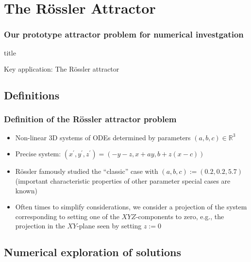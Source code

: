 \documentclass[usenames,svgnames,dvipsnames,10pt]{beamer}
\newcommand{\TitleBoxed}[1]{
     \begin{beamercolorbox}[sep=8pt,center,shadow=true,rounded=true]{title}
          \usebeamerfont{title}#1\vskip 0.6cm\par%
     \end{beamercolorbox}
}
\begin{document}
\section{The R\"ossler Attractor} 


\begin{frame}
\frametitle{Our prototype attractor problem for numerical investgation} 

\TitleBoxed{
     \huge{\centerline{Key application: The R\"ossler attractor}}
}

\end{frame}

\subsection{Definitions} 

\begin{frame}
\frametitle{Definition of the R\"ossler attractor problem}

\begin{itemize} 

\item Non-linear 3D systems of ODEs determined by parameters $(a, b, c) \in \mathbb{R}^3$ 
\item Precise system: $(x^{\prime}, y^{\prime}, z^{\prime}) = (-y-z, x+ay, b + z(x-c))$ 
\item R\"ossler famously studied the ``classic'' case with $(a, b, c) := (0.2, 0.2, 5.7)$ 
      (important characteristic properties of other parameter special cases are known) 
\item Often times to simplify considerations, we consider a projection of the system corresponding to 
      setting one of the $XYZ$-components to zero, e.g., the projection in the $XY$-plane seen by setting 
      $z := 0$ 

\end{itemize} 

\end{frame}

\subsection{Numerical exploration of solutions} 
\end{document}
